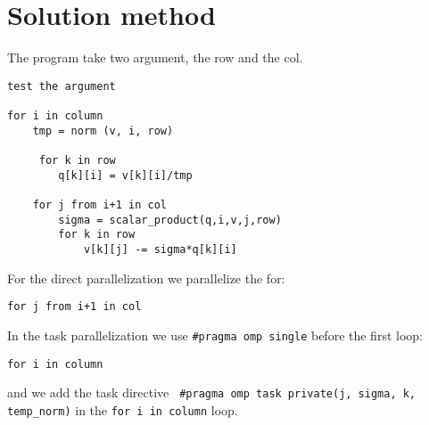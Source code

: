 \chapter{Solution method}

The program take two argument, the row and the col.

\begin{verbatim}
test the argument

for i in column
    tmp = norm (v, i, row)

	 for k in row
        q[k][i] = v[k][i]/tmp

    for j from i+1 in col
        sigma = scalar_product(q,i,v,j,row)
        for k in row
            v[k][j] -= sigma*q[k][i]
\end{verbatim}

For the direct parallelization we parallelize the for:
\begin{verbatim}
for j from i+1 in col
\end{verbatim}

In the task parallelization we use \verb+#pragma omp single+ before the first loop:
\begin{verbatim}
for i in column
\end{verbatim}

and we add the task directive \verb+ #pragma omp task private(j, sigma, k, temp_norm)+ in the \verb+for i in column+ loop.
